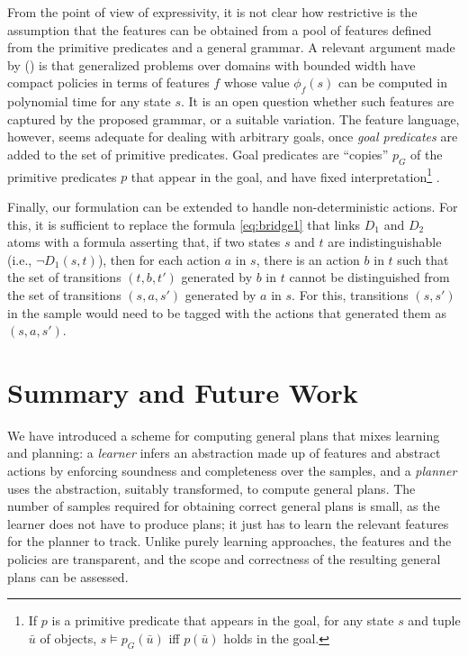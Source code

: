 \documentclass[letterpaper]{article} %
\newcommand{\citeay}[1]{\citeauthor{#1} (\citeyear{#1})}
\begin{document}
From the point of view of expressivity, it is not clear how restrictive
is the assumption  that the  features can be obtained from a pool of  features
defined from the primitive predicates and a general grammar.
A relevant argument made by \citeay{bonet:ijcai2018} is that generalized
problems over domains with bounded width \cite{nir:ecai2012} have compact
policies in terms of features $f$ whose value $\phi_f(s)$ can be computed
in polynomial time for any state $s$. It is an open question whether
such features are  captured by the proposed grammar, or a  suitable variation.
The feature language, however, seems adequate for  dealing with arbitrary goals,
once  \emph{goal predicates} are added to the set of primitive predicates.
Goal predicates are ``copies'' $p_G$ of the primitive predicates $p$ that
appear in the goal, and have fixed interpretation\footnote{If $p$ is
  a primitive predicate that appears in the goal, for any state $s$ and
  tuple $\bar u$ of objects, $s\vDash p_G(\bar u)$ iff $p(\bar u)$
  holds in the goal.}
\cite{martin-geffner:generalized}.


Finally, our formulation can be extended to handle non-deterministic actions.
For this, it is sufficient to replace the formula \eqref{eq:bridge1}
that links $D_1$ and $D_2$ atoms  with a formula asserting that,
if two states $s$ and $t$ are indistinguishable (i.e., $\neg D_1(s,t)$), then
for each action $a$ in $s$, there is an action $b$ in  $t$
such that the set of transitions $(t,b,t')$ generated by $b$ in $t$
cannot be distinguished from the set of transitions $(s,a,s')$ generated by $a$ in $s$.
For this, transitions $(s,s')$ in the sample would need to be tagged with the actions
that generated them as  $(s,a,s')$.



\section{Summary and Future Work}

We have introduced a scheme for computing general plans that mixes
learning and planning: a \emph{learner} infers an abstraction made
up of features and abstract actions by enforcing %
soundness and completeness over the samples, and a \emph{planner}
uses the abstraction, suitably transformed, to compute general plans.
The number of samples required for obtaining correct general plans is
small, as the learner does not have to produce plans; it just
has to learn the relevant features for the planner to track.
Unlike purely learning approaches, the features and the policies
are transparent, and the scope and correctness
of the resulting general plans can be assessed.
\end{document}
